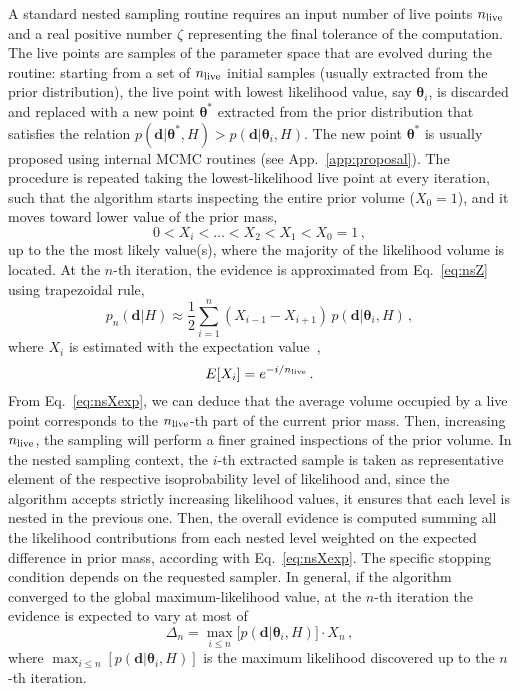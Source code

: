 \documentclass[prd,aps,twocolumn,a4paper,showkeys,nofootinbib,floatfix]{revtex4-1}
\newcommand{\be}{\begin{equation}}
\newcommand{\ee}{\end{equation}}
\def\params{\boldsymbol{\theta}}
\def\data{\textbf{d}}
\begin{document}
A standard nested sampling routine requires 
an input number of live points $n_{\rm live}$
and a real positive number $\zeta$ 
representing the final tolerance of the computation.
The live points are samples of the parameter space 
that are evolved during the routine: 
starting from a set of $n_{\rm live}$ initial samples 
(usually extracted from the prior distribution),
the live point with lowest likelihood value, say $\params_i$, is discarded and 
replaced with a new point $\params^*$ extracted from the prior distribution
that satisfies the relation $ p(\data|\params^*,H) > p(\data|\params_i,H) $.
The new point $\params^*$ is usually proposed using internal MCMC routines (see App.~\ref{app:proposal}).
The procedure is repeated taking the lowest-likelihood 
live point at every iteration, such that the algorithm starts 
inspecting the entire prior volume ($X_0=1$),
and it moves toward lower value of the prior mass,
\be
\label{eq:nsXseries}
0 < X_i <\dots < X_2<X_1<X_0=1 \,,
\ee
up to the the most likely value(s), 
where the majority of the likelihood volume is located.
At the $n$-th iteration, the evidence is approximated from Eq.~\eqref{eq:nsZ} 
using trapezoidal rule,
\be
\label{eq:nsZapprox}
p_n(\data|H)\approx \frac{1}{2} \sum_{i=1}^{n} \left( X_{i-1} - X_{i+1}\right)\, p(\data|\params_i,H)\,,
\ee
where $X_i$ is estimated with the expectation value~\cite{Betancourt_2011},
\be
\label{eq:nsXexp}
E[X_i] = e^{-i/n_{\rm live}}\,.
\ee
From Eq.~\eqref{eq:nsXexp}, we can deduce that 
the average volume occupied by a live point corresponds to
the $n_{\rm live}$-th part of the current prior mass.
Then, increasing $n_{\rm live}$,
the sampling will perform a finer grained inspections of the 
prior volume. 
In the nested sampling context,
the $i$-th extracted sample is taken as representative element of the respective 
 isoprobability level of likelihood and, since the algorithm accepts strictly increasing likelihood values, 
 it ensures that each level is nested in the previous one.
Then, the overall evidence is computed summing all the likelihood contributions from each nested
level weighted on the expected difference in prior mass, according with Eq.~\eqref{eq:nsXexp}.
The specific stopping condition depends on the requested sampler.
In general, 
if the algorithm converged to the global maximum-likelihood value,
at the $n$-th iteration the evidence is expected to vary at most of 
\be
\label{eq:nsdelta}
\Delta_n = \max_{i\le n}\big[ p(\data|\params_i,H)\big]\cdot X_n \,,
\ee
where $\max_{i\le n}[ p(\data|\params_i,H)]$ 
is the maximum likelihood discovered up to the $n$-th iteration.
\end{document}
